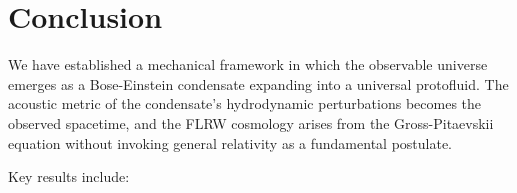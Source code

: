 \documentclass[11pt,a4paper]{article}
\theoremstyle{definition}
\theoremstyle{remark}
\begin{document}
\section{Conclusion}
\label{sec:conclusion}

We have established a mechanical framework in which the observable universe emerges as a Bose-Einstein condensate expanding into a universal protofluid. The acoustic metric of the condensate's hydrodynamic perturbations becomes the observed spacetime, and the FLRW cosmology arises from the Gross-Pitaevskii equation without invoking general relativity as a fundamental postulate.

Key results include:
\end{document}
